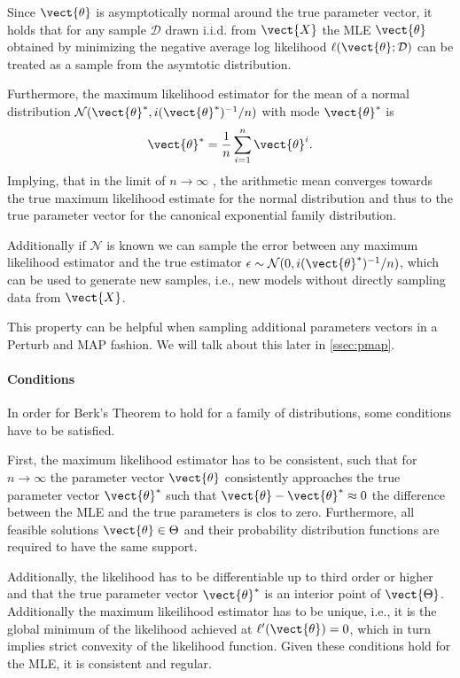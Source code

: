         Since $\vect{\theta}$ is asymptotically normal  around the true parameter vector, it holds that for any sample $\mathcal{D}$ drawn i.i.d. from $\vect{X}$ the MLE $\vect{\theta}$ obtained by minimizing the negative average log likelihood $\ell(\vect{\theta}; \mathcal{D})$ can be treated as a sample from the asymtotic distribution.

        Furthermore, the maximum likelihood estimator for the mean of a normal distribution $\mathcal{N}(\vect{\theta}^*, i(\vect{\theta}^*)^{-1}/n)$ with mode $\vect{\theta}^*$ is
        \begin{equation}
            \vect{\theta}^* = \frac{1}{n} \sum_{i=1}^n \vect{\theta}^{i}.
        \end{equation}
        Implying, that in the limit of $n \rightarrow \infty$ , the arithmetic mean converges towards the true maximum likelihood estimate for the normal distribution and thus to the true parameter vector for the canonical exponential family distribution.
        
        Additionally if $\mathcal{N}$ is known we can sample the error between any maximum likelihood estimator and the true estimator $\epsilon \sim \mathcal{N}(0, i(\vect{\theta}^*)^{-1}/n)$, which can be used to generate new samples, i.e., new models without directly sampling data from $\vect{X}$.

        This property can be helpful when sampling additional parameters vectors in a Perturb and MAP fashion. We will talk about this later in \sect \ref{ssec:pmap}.
        
        \paragraph*{Conditions}
        In order for Berk's Theorem to hold for a family of distributions, some conditions have to be satisfied.

        First, the maximum likelihood estimator has to be consistent, such that for $n\rightarrow \infty$ the parameter vector $\vect{\theta}$ consistently approaches the true parameter vector $\vect{\theta}^*$ such that $\vect{\theta} - \vect{\theta}^* \approx 0$ the difference between the MLE and the true parameters is clos to zero.
        Furthermore, all feasible solutions $\vect{\theta}  \in \Theta$ and their probability distribution functions are required to have the same support.
        
        Additionally, the likelihood has to be differentiable up to third order or higher and that the true parameter vector $\vect{\theta}^*$ is an interior point of $\vect{\Theta}$.
        Additionally the maximum likeilihood estimator has to be unique, i.e., it is the global minimum of the likelihood achieved at $\ell'(\vect{\theta}) = 0$, which in turn implies strict convexity of the likelihood function.
        Given these conditions hold for the MLE, it is consistent and regular.

